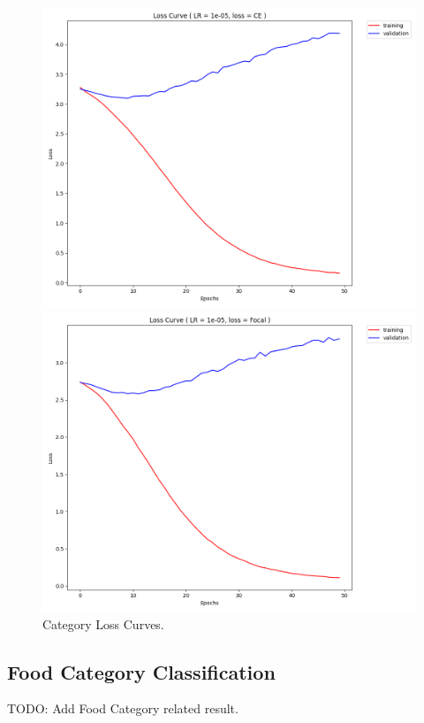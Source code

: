 \documentclass[10pt,twocolumn,letterpaper]{article}
\begin{document}
\begin{figure}
\begin{subfigure}
    \begin{left}
    \includegraphics[width=0.45\linewidth]{lr_1e-05_e50_CE_loss_history}
    \end{left}
\end{subfigure}%
\begin{subfigure}
    \begin{right}
    \includegraphics[width=0.45\linewidth]{lr_1e-05_e50_Focal_loss_history}
    \end{right}
\end{subfigure}%
  \caption{Category Loss Curves.}
\label{fig:loss_curve}
\end{figure}
\subsection{Food Category Classification}
TODO: Add Food Category related result.
\end{document}
